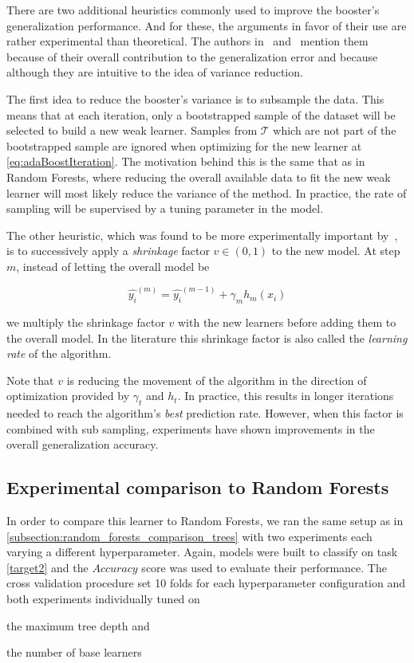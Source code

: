 There are two additional heuristics commonly used to improve the booster's generalization performance.
And for these, the arguments in favor of their use are rather experimental than theoretical.
The authors in~\citep{hastie-elemstatslearn} and~\citep{bishop-patternRecognition} mention them because of their overall contribution to the generalization error and because although they are intuitive to the idea of variance reduction.

The first idea to reduce the booster's variance is to subsample the data.
This means that at each iteration, only a bootstrapped sample of the dataset will be selected to build a new weak learner.
Samples from $\mathcal{T}$ which are not part of the bootstrapped sample are ignored when optimizing for the new learner at \cref{eq:adaBoostIteration}.
The motivation behind this is the same that as in Random Forests, where reducing the overall available data to fit the new weak learner will most likely reduce the variance of the method.
In practice, the rate of sampling will be supervised by a tuning parameter in the model.

The other heuristic, which was found to be more experimentally important by~\citep{hastie-elemstatslearn}, is to successively apply a \textit{shrinkage} factor $v \in (0,1)$ to the new model.
At step $m$, instead of letting the overall model be

\begin{equation}
\hat{y_i}^{(m)} = \hat{y_i}^{(m-1)} + \gamma_m h_m(x_i)
\end{equation}

 we multiply the shrinkage factor $v$ with the new learners before adding them to the overall model.
In the literature this shrinkage factor is also called the \textit{learning rate} of the algorithm.

Note that $v$ is reducing the movement of the algorithm in the direction of optimization provided by $\gamma_t$ and $h_t$.
In practice, this results in longer iterations needed to reach the algorithm's \textit{best} prediction rate.
However, when this factor is combined with sub sampling, experiments have shown improvements in the overall generalization accuracy.


\subsection{ Experimental comparison to Random Forests}\label{subsection:boosting_comparison_forest}

In order to compare this learner to Random Forests, we ran the same setup as in \cref{subsection:random_forests_comparison_trees}
with two experiments each varying a different hyperparameter.
Again, models were built to classify on task \cref{target2} and the $Accuracy$ score was used to evaluate their performance.
The cross validation procedure set 10 folds for each hyperparameter configuration and both experiments individually tuned on
\begin{enumerate*}[label={\alph*)},]
\item the maximum tree depth and
\item the number of base learners
\end{enumerate*}

